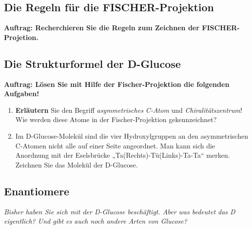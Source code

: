 \documentclass{scrartcl}  %
\begin{document}
		\subsection{Die Regeln für die FISCHER-Projektion}
		
			\textbf{Auftrag: Recherchieren Sie die Regeln zum Zeichnen der FISCHER-Projetion.}
		
		\subsection{Die Strukturformel der D-Glucose}
			
			\textbf{Auftrag: Lösen Sie mit Hilfe der Fischer-Projektion die folgenden Aufgaben!}
			
			\begin{enumerate}
				\item \textbf{Erläutern} Sie den Begriff \textit{asymmetrisches C-Atom} und \textit{Chiralitätszentrum}! Wie werden diese Atome in der Fischer-Projektion gekennzeichnet?
				\item Im D-Glucose-Molekül sind die vier Hydroxylgruppen an den asymmetrischen C-Atomen nicht alle auf einer Seite angeordnet. Man kann sich die Anordnung mit der Eselsbrücke „Ta(Rechts)-Tü(Links)-Ta-Ta“ merken. Zeichnen Sie das Molekül der D-Glucose.
			\end{enumerate}
			
		\subsection{Enantiomere}
			
			\textit{Bisher haben Sie sich mit der D-Glucose beschäftigt. Aber was bedeutet das D eigentlich? Und gibt es auch noch andere Arten von Glucose?} \newline
			
\end{document}
